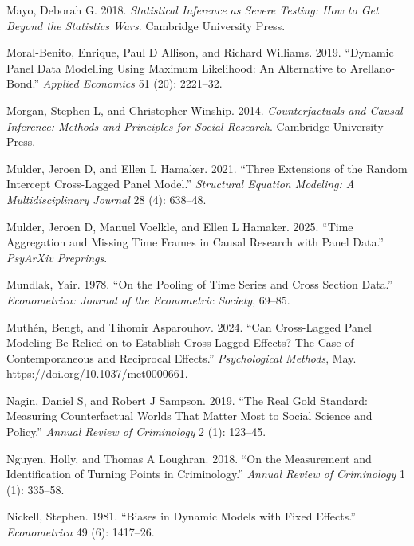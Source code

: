 \documentclass[
  letterpaper,
  DIV=11,
  numbers=noendperiod]{scrartcl}
\newlength{\cslhangindent}
\newenvironment{CSLReferences}[2] %
 {\begin{list}{}{%
  \setlength{\itemindent}{0pt}
  \setlength{\leftmargin}{0pt}
  \setlength{\parsep}{0pt}
  \ifodd #1
   \setlength{\leftmargin}{\cslhangindent}
   \setlength{\itemindent}{-1\cslhangindent}
  \fi
  \setlength{\itemsep}{#2\baselineskip}}}
 {\end{list}}
\begin{document}
\begin{CSLReferences}{1}{0}
Mayo, Deborah G. 2018. \emph{Statistical Inference as Severe Testing:
How to Get Beyond the Statistics Wars}. Cambridge University Press.

Moral-Benito, Enrique, Paul D Allison, and Richard Williams. 2019.
{``Dynamic Panel Data Modelling Using Maximum Likelihood: An Alternative
to Arellano-Bond.''} \emph{Applied Economics} 51 (20): 2221--32.

Morgan, Stephen L, and Christopher Winship. 2014. \emph{Counterfactuals
and Causal Inference: Methods and Principles for Social Research}.
Cambridge University Press.

Mulder, Jeroen D, and Ellen L Hamaker. 2021. {``Three Extensions of the
Random Intercept Cross-Lagged Panel Model.''} \emph{Structural Equation
Modeling: A Multidisciplinary Journal} 28 (4): 638--48.

Mulder, Jeroen D, Manuel Voelkle, and Ellen L Hamaker. 2025. {``Time
Aggregation and Missing Time Frames in Causal Research with Panel
Data.''} \emph{PsyArXiv Preprings}.

Mundlak, Yair. 1978. {``On the Pooling of Time Series and Cross Section
Data.''} \emph{Econometrica: Journal of the Econometric Society},
69--85.

Muthén, Bengt, and Tihomir Asparouhov. 2024. {``Can Cross-Lagged Panel
Modeling Be Relied on to Establish Cross-Lagged Effects? The Case of
Contemporaneous and Reciprocal Effects.''} \emph{Psychological Methods},
May. \url{https://doi.org/10.1037/met0000661}.

Nagin, Daniel S, and Robert J Sampson. 2019. {``The Real Gold Standard:
Measuring Counterfactual Worlds That Matter Most to Social Science and
Policy.''} \emph{Annual Review of Criminology} 2 (1): 123--45.

Nguyen, Holly, and Thomas A Loughran. 2018. {``On the Measurement and
Identification of Turning Points in Criminology.''} \emph{Annual Review
of Criminology} 1 (1): 335--58.

Nickell, Stephen. 1981. {``Biases in Dynamic Models with Fixed
Effects.''} \emph{Econometrica} 49 (6): 1417--26.


\end{CSLReferences}
\end{document}
